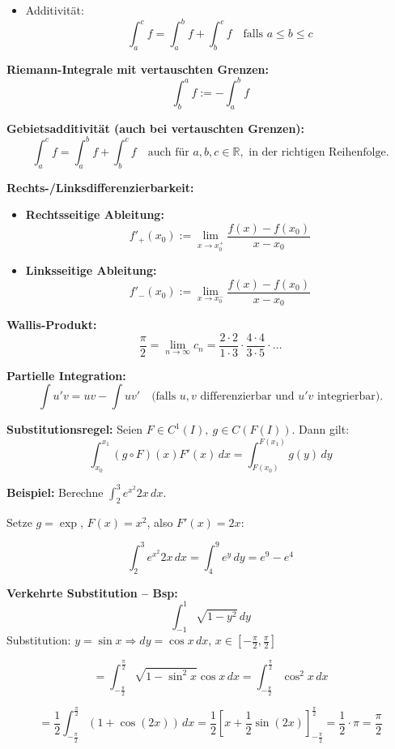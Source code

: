 \begin{itemize}
\begin{itemize}
  \item Additivität:
  \[
    \int_a^c f = \int_a^b f + \int_b^c f \quad \text{falls } a \le b \le c
  \]
\end{itemize}

\textbf{Riemann-Integrale mit vertauschten Grenzen:}
\[
\int_b^a f := - \int_a^b f
\]

\textbf{Gebietsadditivität (auch bei vertauschten Grenzen):}
\[
\int_a^c f = \int_a^b f + \int_b^c f
\quad \text{auch für } a, b, c \in \mathbb{R}, \text{ in der richtigen Reihenfolge.}
\]

\textbf{Rechts-/Linksdifferenzierbarkeit:}
\begin{itemize}
  \item \textbf{Rechtsseitige Ableitung:}
  \[
  f'_{+}(x_0) := \lim_{x \to x_0^+} \frac{f(x) - f(x_0)}{x - x_0}
  \]
  \item \textbf{Linksseitige Ableitung:}
  \[
  f'_{-}(x_0) := \lim_{x \to x_0^-} \frac{f(x) - f(x_0)}{x - x_0}
  \]
\end{itemize}

\textbf{Wallis-Produkt:}
\[
\frac{\pi}{2} = \lim_{n \to \infty} c_n = \frac{2 \cdot 2}{1 \cdot 3} \cdot \frac{4 \cdot 4}{3 \cdot 5} \cdot \ldots
\]


\textbf{Partielle Integration:}
\[
\int u'v = uv - \int uv'
\quad \text{(falls } u,v \text{ differenzierbar und } u'v \text{ integrierbar).}
\]

\textbf{Substitutionsregel:} Seien $F \in C^1(I),\ g \in C(F(I))$. Dann gilt:
\[
\int_{x_0}^{x_1} (g \circ F)(x) F'(x)\, dx = \int_{F(x_0)}^{F(x_1)} g(y)\, dy
\]

\textbf{Beispiel:} Berechne $\int_2^3 e^{x^2} 2x \, dx$.

Setze $g = \exp$, $F(x) = x^2$, also $F'(x) = 2x$:

\[
\int_2^3 e^{x^2} 2x\, dx = \int_{4}^{9} e^y\, dy = e^9 - e^4
\]

\textbf{Verkehrte Substitution – Bsp:}
\[
\int_{-1}^{1} \sqrt{1 - y^2} \, dy
\]
Substitution: \( y = \sin x \Rightarrow dy = \cos x \, dx \), \( x \in \left[-\tfrac{\pi}{2}, \tfrac{\pi}{2}\right] \)

\[
= \int_{-\frac{\pi}{2}}^{\frac{\pi}{2}} \sqrt{1 - \sin^2 x} \cos x \, dx = \int_{-\frac{\pi}{2}}^{\frac{\pi}{2}} \cos^2 x \, dx
\]

\[
= \frac{1}{2} \int_{-\frac{\pi}{2}}^{\frac{\pi}{2}} (1 + \cos(2x)) \, dx = \frac{1}{2} \left[ x + \frac{1}{2} \sin(2x) \right]_{-\frac{\pi}{2}}^{\frac{\pi}{2}} = \frac{1}{2} \cdot \pi = \frac{\pi}{2}
\]


\end{itemize}
